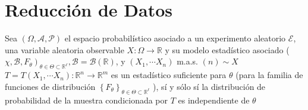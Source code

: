 \section{Reducción de Datos}

\begin{definición}
  Sea $(\Omega, \mathcal{A}, \mathcal{P})$ el espacio probabilístico asociado a un experimento aleatorio $\mathcal{E}$, una variable aleatoria observable $X: \Omega \longrightarrow \mathbb{R}$ y su modelo estadístico asociado ( $\left.\chi, \mathcal{B}, F_{\theta}\right)_{\theta \in \Theta \subset \mathbb{R}^{\ell}}, \mathcal{B}=\mathcal{B}(\mathbb{R})$, y $\left(X_{1}, \cdots X_{n}\right)$ m.a.s. $(n) \sim X$\\
  $T=T\left(X_{1}, \cdots X_{n}\right): \mathbb{R}^{n} \longrightarrow \mathbb{R}^{m}$ es un estadístico suficiente para $\theta$ (para la familia de funciones de distribución $\left\{F_{\theta}\right\}_{\theta \in \Theta \subset \mathbb{R}^{\ell}}$ ), sí y sólo sí la distribución de probabilidad de la muestra condicionada por $T$ es independiente de $\theta$
  \end{definición}
  
  
